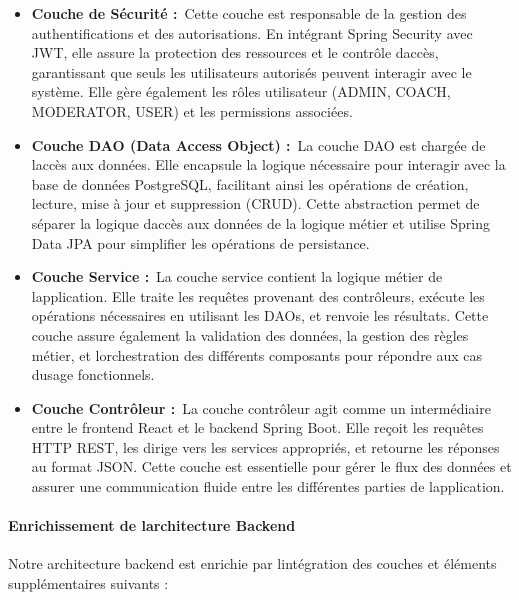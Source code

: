 \documentclass[12pt,a4paper,twoside,openright]{report}
\begin{document}
\begin{itemize}
\item
  \textbf{Couche de Sécurité :}~Cette couche est responsable de la
  gestion des authentifications et des autorisations. En intégrant
  Spring Security avec JWT, elle assure la protection des ressources et
  le contrôle d\textquotesingle accès, garantissant que seuls les
  utilisateurs autorisés peuvent interagir avec le système. Elle gère
  également les rôles utilisateur (ADMIN, COACH, MODERATOR, USER) et les
  permissions associées.
\item
  \textbf{Couche DAO (Data Access Object) :}~La couche DAO est chargée
  de l\textquotesingle accès aux données. Elle encapsule la logique
  nécessaire pour interagir avec la base de données PostgreSQL,
  facilitant ainsi les opérations de création, lecture, mise à jour et
  suppression (CRUD). Cette abstraction permet de séparer la logique
  d\textquotesingle accès aux données de la logique métier et utilise
  Spring Data JPA pour simplifier les opérations de persistance.
\item
  \textbf{Couche Service :}~La couche service contient la logique métier
  de l\textquotesingle application. Elle traite les requêtes provenant
  des contrôleurs, exécute les opérations nécessaires en utilisant les
  DAOs, et renvoie les résultats. Cette couche assure également la
  validation des données, la gestion des règles métier, et
  l\textquotesingle orchestration des différents composants pour
  répondre aux cas d\textquotesingle usage fonctionnels.
\item
  \textbf{Couche Contrôleur :}~La couche contrôleur agit comme un
  intermédiaire entre le frontend React et le backend Spring Boot. Elle
  reçoit les requêtes HTTP REST, les dirige vers les services
  appropriés, et retourne les réponses au format JSON. Cette couche est
  essentielle pour gérer le flux des données et assurer une
  communication fluide entre les différentes parties de
  l\textquotesingle application.
\end{itemize}

\hypertarget{enrichissement-de-larchitecture-backend}{%
\paragraph{Enrichissement de l\textquotesingle architecture
Backend}\label{enrichissement-de-larchitecture-backend}}

Notre architecture backend est enrichie par
l\textquotesingle intégration des couches et éléments supplémentaires
suivants :
\end{document}

